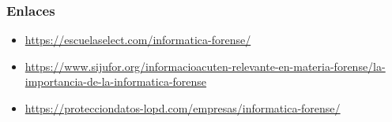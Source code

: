 \documentclass[12pt]{beamer}
\begin{document}
\begin{frame}
\frametitle{Enlaces}
\begin{itemize}
	
\item \textcolor{blue}{\url{https://escuelaselect.com/informatica-forense/}}

\item \textcolor{blue}{\url{https://www.sijufor.org/informacioacuten-relevante-en-materia-forense/la-importancia-de-la-informatica-forense}}

\item \textcolor{blue}{\url{https://protecciondatos-lopd.com/empresas/informatica-forense/}}

\end{itemize}
\end{frame}
\end{document}
